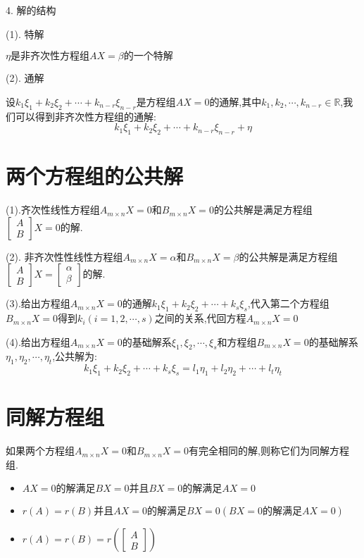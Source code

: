 \begin{definition}[非齐次方程组]
	4. 解的结构
	
	(1). 特解
	
	$\eta\text{是非齐次性方程组}AX=\beta\text{的一个特解}$
	
	(2). 通解
	
	设$k_{1}\xi_{1}+k_{2}\xi_{2}+\cdots+k_{n-r}\xi_{n-r}$是方程组$AX=0$的通解,其中$k_{1},k_{2},\cdots,k_{n-r}\in \mathbb{R}$,我们可以得到非齐次性方程组的通解:  
	$$k_{1}\xi_{1}+k_{2}\xi_{2}+\cdots+k_{n-r}\xi_{n-r}+\eta$$
\end{definition}
\section{两个方程组的公共解}
\begin{definition}[两个方程组的公共解]
	(1).齐次性线性方程组$A_{m\times n}X=0$和$B_{m\times n}X=0$的公共解是满足方程组$\left[
	\begin{matrix}
		A\\B
	\end{matrix}
	\right]X=0$的解.
	
	(2). 非齐次性性线性方程组$A_{m\times n}X=\alpha$和$B_{m\times n}X=\beta$的公共解是满足方程组$\left[
	\begin{matrix}
		A\\B
	\end{matrix}
	\right]X=\left[
	\begin{matrix}
		\alpha\\\beta
	\end{matrix}
	\right]$的解.
	
	(3).给出方程组$A_{m\times n}X=0$的通解$k_{1}\xi_{1}+k_{2}\xi_{2}+\cdots+k_{s}\xi_{s}$,代入第二个方程组$B_{m\times n}X=0$得到$k_{i}(i=1,2,\cdots,s)$之间的关系,代回方程$A_{m\times n}X=0$
	
	(4).给出方程组$A_{m\times n}X=0$的基础解系$\xi_{1},\xi_{2},\cdots,\xi_{s}$和方程组$B_{m\times n}X=0$的基础解系$\eta_{1},\eta_{2},\cdots,\eta_{t}$,公共解为:  
	$$k_{1}\xi_{1}+k_{2}\xi_{2}+\cdots+k_{s}\xi_{s}=l_{1}\eta_{1}+l_{2}\eta_{2}+\cdots+l_{t}\eta_{t}$$
\end{definition}
\section{同解方程组}
\begin{definition}[同解方程组]
	如果两个方程组$A_{m\times n}X=0$和$B_{m\times n}X=0$有完全相同的解,则称它们为同解方程组.
	\begin{itemize}
		\item $AX=0\text{的解满足}BX=0\text{并且} BX=0\text{的解满足}AX=0$
		\item $r(A)=r(B)\text{并且}AX=0\text{的解满足}BX=0(BX=0\text{的解满足}AX=0)$
		\item $r(A)=r(B)=r(\left[
		\begin{matrix}
			A\\B
		\end{matrix}
		\right])$
	\end{itemize}
\end{definition}
